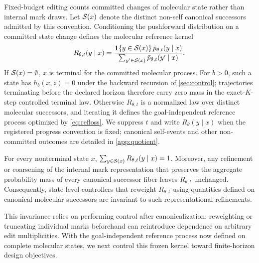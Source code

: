 Fixed-budget editing counts committed changes of molecular state rather than internal mark draws. Let $\mathcal{S}(x)$ denote the distinct non-self canonical successors admitted by this convention. Conditioning the pushforward distribution on a committed state change defines the molecular reference kernel
\begin{equation}
R_{\theta,t}(y\mid x)=\frac{\mathbf{1}\{y\in\mathcal{S}(x)\}\,\bar p_{\theta,t}(y\mid x)}{\sum_{y'\in\mathcal{S}(x)}\bar p_{\theta,t}(y'\mid x)}.
\label{eq:rtheta}
\end{equation}
If $\mathcal{S}(x)=\emptyset$, $x$ is terminal for the committed molecular process. For $b>0$, such a state has $h_b(x,z)=0$ under the backward recursion of \cref{sec:control}; trajectories terminating before the declared horizon therefore carry zero mass in the exact-$K$-step controlled terminal law. Otherwise $R_{\theta,t}$ is a normalized law over distinct molecular successors, and iterating it defines the goal-independent reference process optimized by \cref{eq:refloss}. We suppress $t$ and write $R_\theta(y\mid x)$ when the registered progress convention is fixed; canonical self-events and other non-committed outcomes are detailed in \cref{app:quotient}.

\begin{proposition}
\label{prop:canonical}
For every nonterminal state $x$, $\sum_{y\in\mathcal{S}(x)}R_{\theta,t}(y\mid x)=1$. Moreover, any refinement or coarsening of the internal mark representation that preserves the aggregate probability mass of every canonical successor fiber leaves $R_{\theta,t}$ unchanged. Consequently, state-level controllers that reweight $R_{\theta,t}$ using quantities defined on canonical molecular successors are invariant to such representational refinements.
\end{proposition}

This invariance relies on performing control after canonicalization: reweighting or truncating individual marks beforehand can reintroduce dependence on arbitrary edit multiplicities. With the goal-independent reference process now defined on complete molecular states, we next control this frozen kernel toward finite-horizon design objectives.
